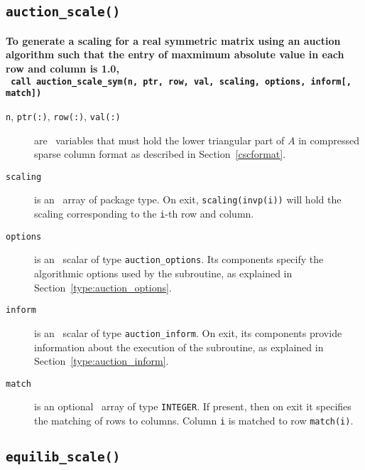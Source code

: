 
\subsection{\texttt{auction\_scale()}}

\textbf{\noindent
   To generate a scaling for a real symmetric matrix using an auction algorithm such that the entry of maxmimum absolute value in each row and column is 1.0,
   \vspace*{0.1cm} \\
   \texttt{ \hspace*{0.2cm}
      call auction\_scale\_sym(n, ptr, row, val, scaling, options, inform[, match])
   }
   \vspace{0.3cm}
}

\begin{description}

\item[\texttt{n}, \texttt{ptr(:)}, \texttt{row(:)}, \texttt{val(:)}] are \intentin\ variables that must hold the lower triangular part of $A$ in compressed sparse column format as described in Section~\ref{cscformat}.

\item[\texttt{scaling}] is an \intentout\ array of package type. On exit,
\texttt{scaling(invp(i))} will hold the scaling corresponding to the
\texttt{i}-th row and column.

\item[\texttt{options}] is an \intentin\ scalar of type \texttt{auction\_options}. Its components specify the algorithmic options used by the subroutine, as explained in Section~\ref{type:auction_options}.

\item[\texttt{inform}] is an \intentout\ scalar of type \texttt{auction\_inform}. On exit, its components provide information about the execution of the subroutine, as explained in Section~\ref{type:auction_inform}.

\item[\texttt{match}] is an optional \intentout\ array of type {\tt INTEGER}.
If present, then on exit it specifies the matching of rows to columns.
Column \texttt{i} is matched to row \texttt{match(i)}.

\end{description}


\subsection{\texttt{equilib\_scale()}}

